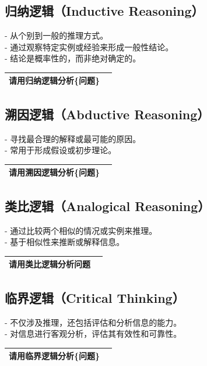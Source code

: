 \documentclass[12pt]{book}
\begin{document}
\subsection{归纳逻辑（Inductive Reasoning）}
\bigskip
- 从个别到一般的推理方式。\\
- 通过观察特定实例或经验来形成一般性结论。\\
- 结论是概率性的，而非绝对确定的。\\

\begin{tabular}{|p{15cm}|p{3cm}|}
	\hline
请用归纳逻辑分析\{问题\}\\
	\hline
\end{tabular}


\subsection{溯因逻辑（Abductive Reasoning）}
\bigskip
- 寻找最合理的解释或最可能的原因。\\
- 常用于形成假设或初步理论。\\

\begin{tabular}{|p{15cm}|p{3cm}|}
	\hline
请用溯因逻辑分析\{问题\}\\
	\hline
\end{tabular}



\subsection{类比逻辑（Analogical Reasoning）}
\bigskip
- 通过比较两个相似的情况或实例来推理。\\
- 基于相似性来推断或解释信息。\\

\begin{tabular}{|p{15cm}|p{3cm}|}
	\hline
请用类比逻辑分析{问题}\\
	\hline
\end{tabular}


\subsection{临界逻辑（Critical Thinking）}
\bigskip
- 不仅涉及推理，还包括评估和分析信息的能力。\\
- 对信息进行客观分析，评估其有效性和可靠性。\\

\begin{tabular}{|p{15cm}|p{3cm}|}
	\hline
请用临界逻辑分析\{问题\}\\
	\hline
\end{tabular}
\end{document}
